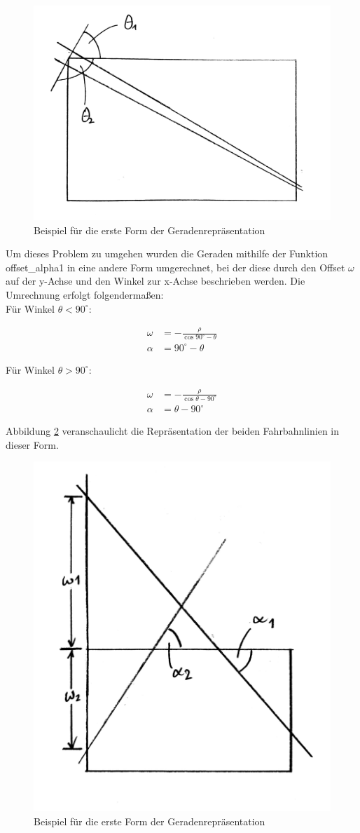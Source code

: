 \documentclass[a4paper,12pt]{article}
\begin{document}
	
	
	\begin{figure}[H]
		\centering
		\includegraphics[width=.5\linewidth]{images/rho_theta2.jpg}
		\caption{Beispiel für die erste Form der Geradenrepräsentation}
		\label{fig:rho_theta2}
	\end{figure}

	Um dieses Problem zu umgehen wurden die Geraden mithilfe der Funktion offset\_alpha1 in eine andere Form umgerechnet, bei der diese durch den Offset $\omega$ auf der y-Achse und den Winkel zur x-Achse beschrieben werden. Die Umrechnung erfolgt folgendermaßen:\\
	
	Für Winkel $\theta<90^\circ$:
	
	\begin{align*}
		\omega&=-\frac{\rho}{\cos{90^{\circ}-\theta}} \\
		\alpha&=90^{\circ}-\theta
	\end{align*}
	
	Für Winkel $\theta>90^\circ$:
	
	\begin{align*}
		\omega&=-\frac{\rho}{\cos{\theta-90^{\circ}}} \\
		\alpha&=\theta-90^{\circ}
	\end{align*}
	
	Abbildung \ref{fig:alpha_omega1} veranschaulicht die Repräsentation der beiden Fahrbahnlinien in dieser Form.
	
	\begin{figure}[H]
		\centering
		\includegraphics[width=.5\linewidth]{images/alpha_omega1.jpg}
		\caption{Beispiel für die erste Form der Geradenrepräsentation}
		\label{fig:alpha_omega1}
	\end{figure}
\end{document}
